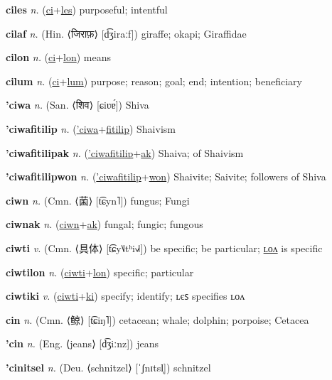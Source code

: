 \textbf{\hypertarget{ciles}{ciles}} \textit{n.} (\hyperlink{ci}{ci}+\allowbreak \hyperlink{les}{les})
purposeful; intentful

\textbf{\hypertarget{cilaf}{cilaf}} \textit{n.} (Hin. ⟨{\devanagari{}जिराफ़}⟩ [d͡ʒiraːf])
giraffe; okapi; Giraffidae

\textbf{\hypertarget{cilon}{cilon}} \textit{n.} (\hyperlink{ci}{ci}+\allowbreak \hyperlink{lon}{lon})
means

\textbf{\hypertarget{cilum}{cilum}} \textit{n.} (\hyperlink{ci}{ci}+\allowbreak \hyperlink{lum}{lum})
purpose; reason; goal; end; intention; beneficiary

\textbf{\hypertarget{'ciwa}{'ciwa}} \textit{n.} (San. ⟨{\devanagari{}शिव}⟩ [ɕiʋɐ́])
Shiva

\textbf{\hypertarget{'ciwafitilip}{'ciwafitilip}} \textit{n.} (\hyperlink{'ciwa}{'ciwa}+\allowbreak \hyperlink{fitilip}{fitilip})
Shaivism

\textbf{\hypertarget{'ciwafitilipak}{'ciwafitilipak}} \textit{n.} (\hyperlink{'ciwafitilip}{'ciwafitilip}+\allowbreak \hyperlink{ak}{ak})
Shaiva; of Shaivism

\textbf{\hypertarget{'ciwafitilipwon}{'ciwafitilipwon}} \textit{n.} (\hyperlink{'ciwafitilip}{'ciwafitilip}+\allowbreak \hyperlink{won}{won})
Shaivite; Saivite; followers of Shiva

\textbf{\hypertarget{ciwn}{ciwn}} \textit{n.} (Cmn. ⟨{\chinese{}菌}⟩ [t͡ɕyn˥])
fungus; Fungi

\textbf{\hypertarget{ciwnak}{ciwnak}} \textit{n.} (\hyperlink{ciwn}{ciwn}+\allowbreak \hyperlink{ak}{ak})
fungal; fungic; fungous

\textbf{\hypertarget{ciwti}{ciwti}} \textit{v.} (Cmn. ⟨{\chinese{}具体}⟩ [t͡ɕy˥˩tʰi˧˩˧])
be specific; be particular; \hyperlink{ciwtilon}{ʟᴏᴧ} is specific

\textbf{\hypertarget{ciwtilon}{ciwtilon}} \textit{n.} (\hyperlink{ciwti}{ciwti}+\allowbreak \hyperlink{lon}{lon})
specific; particular

\textbf{\hypertarget{ciwtiki}{ciwtiki}} \textit{v.} (\hyperlink{ciwti}{ciwti}+\allowbreak \hyperlink{ki}{ki})
specify; identify; ʟєꜱ specifies ʟᴏᴧ

\textbf{\hypertarget{cin}{cin}} \textit{n.} (Cmn. ⟨{\chinese{}鲸}⟩ [t͡ɕiŋ˥])
cetacean; whale; dolphin; porpoise; Cetacea

\textbf{\hypertarget{'cin}{'cin}} \textit{n.} (Eng. ⟨jeans⟩ [d͡ʒiːnz])
jeans

\textbf{\hypertarget{'cinitsel}{'cinitsel}} \textit{n.} (Deu. ⟨schnitzel⟩ [ˈʃnɪtsl̩])
schnitzel


